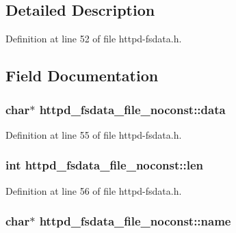 \subsection{Detailed Description}


Definition at line 52 of file httpd-\/fsdata.h.



\subsection{Field Documentation}
\hypertarget{structhttpd__fsdata__file__noconst_aad8f44eb77b6118f6ef8c19d20e15bae}{
\subsubsection[{data}]{\setlength{\rightskip}{0pt plus 5cm}char$\ast$ {\bf httpd\_\-fsdata\_\-file\_\-noconst::data}}}
\label{structhttpd__fsdata__file__noconst_aad8f44eb77b6118f6ef8c19d20e15bae}


Definition at line 55 of file httpd-\/fsdata.h.

\hypertarget{structhttpd__fsdata__file__noconst_a48dc8b78bacc34fe5eff4a3b348cb13f}{
\subsubsection[{len}]{\setlength{\rightskip}{0pt plus 5cm}int {\bf httpd\_\-fsdata\_\-file\_\-noconst::len}}}
\label{structhttpd__fsdata__file__noconst_a48dc8b78bacc34fe5eff4a3b348cb13f}


Definition at line 56 of file httpd-\/fsdata.h.

\hypertarget{structhttpd__fsdata__file__noconst_a63e0ed72114a600a6996a7d8255f16a0}{
\subsubsection[{name}]{\setlength{\rightskip}{0pt plus 5cm}char$\ast$ {\bf httpd\_\-fsdata\_\-file\_\-noconst::name}}}
\label{structhttpd__fsdata__file__noconst_a63e0ed72114a600a6996a7d8255f16a0}


